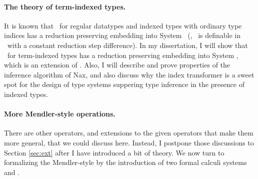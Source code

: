 \paragraph{The theory of term-indexed types.}
It is known that \MIt\ for regular datatypes and indexed types with ordinary
type indices has a reduction preserving embedding into System \Fw\ (\ie, \MIt\
is definable in \Fw\ with a constant reduction step difference).
In my dissertation, I will show that \MIt\ for term-indexed types has a
reduction preserving embedding into System \Fi, which is an extension of \Fw.
Also, I will describe and prove properties of the inference algorithm of Nax,
and also discuss why the index transformer is a sweet spot for the design of
type systems suppering type inference in the presence of indexed types.

\paragraph{More Mendler-style operations.} There are other operators, and extensions to the given
operators that make them more general, that we could discuss here. Instead, I postpone those
discussions to Section \ref{sec:ext} after I have introduced a bit of theory. We now turn to
formalizing the Mendler-style by the introduction of two formal calculi systems \Fi~ and \Fixi.




